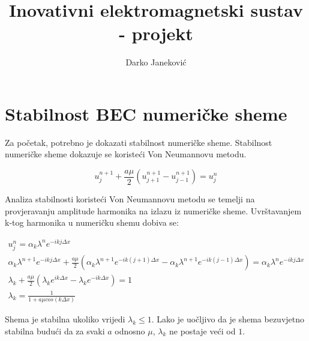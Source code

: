 \documentclass{article}
\title{Inovativni elektromagnetski sustav - projekt}
\author{Darko Janeković}
\begin{document}
\maketitle

\section{Stabilnost BEC numeričke sheme}

Za početak, potrebno je dokazati stabilnost numeričke sheme. Stabilnost
numeričke sheme dokazuje se koristeći Von Neumannovu metodu.

\begin{equation}
    u_j^{n+1} + \frac{a \mu}{2}(u_{j+1}^{n+1} - u_{j-1}^{n+1}) = u_j^n
\end{equation}

Analiza stabilnosti koristeći Von Neumannovu metodu se temelji na provjeravanju
amplitude harmonika na izlazu iz numeričke sheme. Uvrštavanjem k-tog harmonika u
numeričku shemu dobiva se:

\begin{gather}
    u_j^n = \alpha_k \lambda^n e^{-i k j \Delta x} \nonumber \\
    \alpha_k \lambda^{n+1} e^{-i k j \Delta x} + \frac{a \mu}{2}(
        \alpha_k \lambda^{n+1} e^{-i k (j + 1) \Delta x} -
        \alpha_k \lambda^{n+1} e^{-i k (j - 1) \Delta x}
    ) = \alpha_k \lambda^n e^{-i k j \Delta x} \nonumber \\
    \lambda_k + \frac{a \mu}{2}(
        \lambda_k e^{i k \Delta x} -
        \lambda_k e^{-i k  \Delta x}) = 1 \nonumber \\
    \lambda_k = \frac{1}{1 + a \mu cos(k \Delta x)}
\end{gather}

Shema je stabilna ukoliko vrijedi $\lambda_k \le 1$. Lako je uočljivo da je shema
bezuvjetno stabilna budući da za svaki $a$ odnosno $\mu$, $\lambda_k$ ne postaje
veći od $1$.
\end{document}
